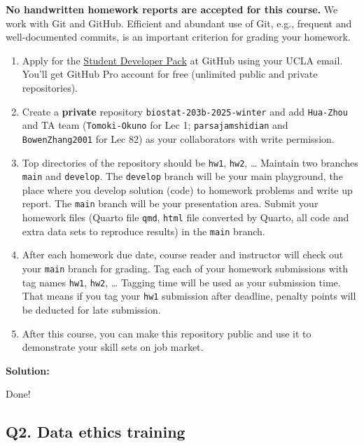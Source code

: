 \documentclass[
]{article}
\begin{document}
\textbf{No handwritten homework reports are accepted for this course.}
We work with Git and GitHub. Efficient and abundant use of Git, e.g.,
frequent and well-documented commits, is an important criterion for
grading your homework.

\begin{enumerate}
\def\labelenumi{\arabic{enumi}.}
\item
  Apply for the \href{https://education.github.com/pack}{Student
  Developer Pack} at GitHub using your UCLA email. You'll get GitHub Pro
  account for free (unlimited public and private repositories).
\item
  Create a \textbf{private} repository \texttt{biostat-203b-2025-winter}
  and add \texttt{Hua-Zhou} and TA team (\texttt{Tomoki-Okuno} for Lec
  1; \texttt{parsajamshidian} and \texttt{BowenZhang2001} for Lec 82) as
  your collaborators with write permission.
\item
  Top directories of the repository should be \texttt{hw1},
  \texttt{hw2}, \ldots{} Maintain two branches \texttt{main} and
  \texttt{develop}. The \texttt{develop} branch will be your main
  playground, the place where you develop solution (code) to homework
  problems and write up report. The \texttt{main} branch will be your
  presentation area. Submit your homework files (Quarto file
  \texttt{qmd}, \texttt{html} file converted by Quarto, all code and
  extra data sets to reproduce results) in the \texttt{main} branch.
\item
  After each homework due date, course reader and instructor will check
  out your \texttt{main} branch for grading. Tag each of your homework
  submissions with tag names \texttt{hw1}, \texttt{hw2}, \ldots{}
  Tagging time will be used as your submission time. That means if you
  tag your \texttt{hw1} submission after deadline, penalty points will
  be deducted for late submission.
\item
  After this course, you can make this repository public and use it to
  demonstrate your skill sets on job market.
\end{enumerate}

\textbf{Solution:}

Done!

\hypertarget{q2.-data-ethics-training}{%
\subsection{Q2. Data ethics training}\label{q2.-data-ethics-training}}
\end{document}
